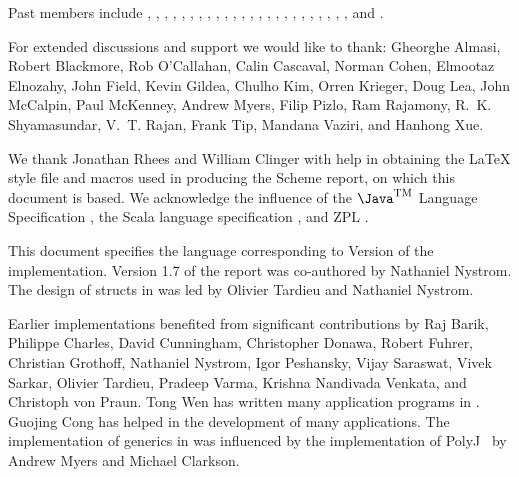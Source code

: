Past members include
, 
, 
, 
, 
, 
, 
, 
, 
,
,
, 
, 
, 
, 
,
,
,  
, 
, 
,
,
, 
,
, and
.

For extended discussions and support we would like to thank: 
Gheorghe Almasi,
Robert Blackmore,
Rob O'Callahan, 
Calin Cascaval, 
Norman Cohen, 
Elmootaz Elnozahy, 
John Field,
Kevin Gildea,
Chulho Kim,
Orren Krieger, 
Doug Lea, 
John McCalpin, 
Paul McKenney, 
Andrew Myers,
Filip Pizlo, 
Ram Rajamony,
R.~K. Shyamasundar, 
V.~T. Rajan, 
Frank Tip,
Mandana Vaziri,
and
Hanhong Xue.


We thank Jonathan Rhees and William Clinger with help in obtaining the
\LaTeX{} style file and macros used in producing the Scheme report,
on which this document is based. We acknowledge the influence of
the $\mbox{\Java}^{\mbox{\textsc{tm}}}$ Language
Specification \cite{jls2}, the Scala language specification
\cite{scala-spec}, and ZPL \cite{zpl}.

This document specifies the language corresponding to Version
\integerversion{}
of the implementation. Version 1.7 of the report was co-authored by
Nathaniel Nystrom. The design of structs in \Xten{} was led by Olivier Tardieu
and Nathaniel Nystrom.

Earlier implementations benefited from significant contributions by
Raj Barik, 
Philippe Charles, 
David Cunningham,
Christopher Donawa, 
Robert Fuhrer,
Christian Grothoff,
Nathaniel Nystrom,  
Igor Peshansky,  
Vijay Saraswat,
Vivek Sarkar, 
Olivier Tardieu,  
Pradeep Varma, 
Krishna Nandivada Venkata, and
Christoph von Praun.
Tong Wen has written many application programs
in \Xten{}. Guojing Cong has helped in the
development of many applications.
The implementation of generics in \Xten{} was influenced by the
implementation of PolyJ~\cite{polyj} by Andrew Myers and Michael Clarkson.
